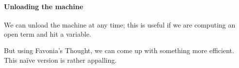 \documentclass{article}
\newcommand\Clo[2]{#1\triangleleft{#2}}
\newcommand\Cons[2]{{#1}\dblcolon{#2}}
\newcommand\Frame[3]{\perfectparens{#1,#2,#3}}
\newcommand\Cfg[3]{\cut{\Clo{#1}{#2}}{#3}}
\begin{document}
\paragraph{Unloading the machine}

We can unload the machine at any time; this is useful if we are
computing an open term and hit a variable.


But using Favonia's Thought, we can come up with something more
efficient. This na\"ive version is rather appalling.
\end{document}
